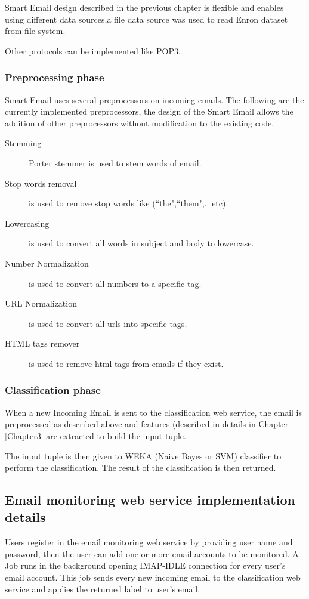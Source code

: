     Smart Email design described in the previous chapter is flexible and enables using different data sources,a file data source was used
    to read Enron \cite{ENRON} dataset from file system.

    Other protocols can be implemented like POP3.

    \subsubsection{Preprocessing phase}
    Smart Email uses several preprocessors on incoming emails. The following are the currently implemented preprocessors,
    the design of the Smart Email allows the addition of other preprocessors without modification to the existing code.
        \begin{description}
        \item[Stemming] Porter stemmer \cite{STEMMER} is used to stem words of email.
        \item[Stop words removal] is used to remove stop words like (``the",``them",.. etc).
        \item[Lowercasing] is used to convert all words in subject and body to lowercase.
        \item[Number Normalization] is used to convert all numbers to a specific tag.
        \item[URL Normalization] is used to convert all urls into specific tags.
        \item[HTML tags remover] is used to remove html tags from emails if they exist.
        \end{description}

    \subsubsection{Classification phase}
    When a new Incoming Email is sent to the classification web service,
    the email is preprocessed as described above and features (described in details in Chapter \ref{Chapter3}
    are extracted to build the input tuple.

    The input tuple is then given to WEKA \cite{WEKA} (Naive Bayes or SVM) classifier to 
    perform the classification. The result of the classification is then returned.

\subsection{Email monitoring web service implementation details}
    Users register in the email monitoring web service by providing user name and password,
    then the user can add one or more email accounts to be monitored.
    A Job runs in the background opening IMAP-IDLE connection for every user's email account.
    This job sends every new incoming email to the classification web service and
    applies the returned label to user's email.

